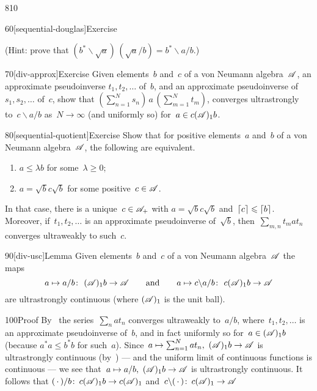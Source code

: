 \begin{parsec}{810}
\begin{point}{60}[sequential-douglas]{Exercise}
\begin{enumerate}
(Hint: prove that $(b^*\backslash \sqrt{a})\,(\sqrt{a}/b)
= b^*\backslash a/b$.)
\end{enumerate}
\end{point}
\begin{point}{70}[div-approx]{Exercise}%
Given elements~$b$ and~$c$ of a von Neumann algebra~$\mathscr{A}$,
an approximate pseudoinverse $t_1,t_2,\dotsc$
of~$b$,
and an approximate pseudoinverse of~$s_1,s_2,\dotsc$
of~$c$,
show that
$(\sum_{n=1}^N s_n) \,a\, (\sum_{m=1}^Nt_m)$,
converges ultrastrongly to~$c\backslash a /b$%
as~$N\to\infty$
(and uniformly so) for~$a\in c(\mathscr{A})_1 b$.
\end{point}
\begin{point}{80}[sequential-quotient]{Exercise}%
Show that for positive elements~$a$ and~$b$ of a von Neumann
algebra~$\mathscr{A}$,
the following are equivalent.
\begin{enumerate}
\item
$a\leq \lambda b$ for some~$\lambda\geq 0$;
\item
$a=\sqrt{b}c\sqrt{b}$
for some positive~$c\in\mathscr{A}$.
\end{enumerate}
In that case, there is a unique~$c\in\mathscr{A}_+$
with $a=\sqrt{b}c\sqrt{b}$
and~$\left\lceil c\right\rceil\leqslant \left\lceil b\right\rceil$.
Moreover,
if~$t_1,t_2,\dotsc$
is an approximate pseudoinverse of~$\sqrt{b}$,
then~$\sum_{m,n} t_m a t_n$
converges ultraweakly to such~$c$.
\end{point}
\begin{point}{90}[div-usc]{Lemma}%
Given elements~$b$ and~$c$  of a von Neumann algebra~$\mathscr{A}$
the maps 
\begin{equation*}
	a\mapsto a/b\colon \  (\mathscr{A})_1b \to \mathscr{A}
\qquad\text{and}\qquad
a\mapsto c\backslash a/b\colon\  c(\mathscr{A})_1b\to \mathscr{A}
\end{equation*}
are ultrastrongly continuous
(where $(\mathscr{A})_1$ is the unit ball).
\begin{point}{100}{Proof}%
By~
the series~$\sum_n at_n$ converges ultraweakly to~$a/b$,
where~$t_1,t_2,\dotsc$
is an approximate pseudoinverse of~$b$,
and in fact uniformly so for~$a\in(\mathscr{A})_1 b$
(because $a^*a\leq b^*b$ for such~$a$).
Since~$a\mapsto \sum_{n=1}^N at_n,\ (\scrA)_1b\to\scrA$
is ultrastrongly continuous (by~)
--- and the uniform limit of continuous functions is continuous ---
we see that~$a\mapsto a/b,
\ (\mathscr{A})_1b\to\mathscr{A}$ is ultrastrongly continuous.
It follows that
$(\,\cdot\,)/b\colon\,c(\mathscr{A})_1b\to c(\mathscr{A})_1$
and~$c\backslash(\,\cdot\,)\colon\, c(\mathscr{A})_1\to\mathscr{A}$

\end{point}
\end{point}
\end{parsec}
